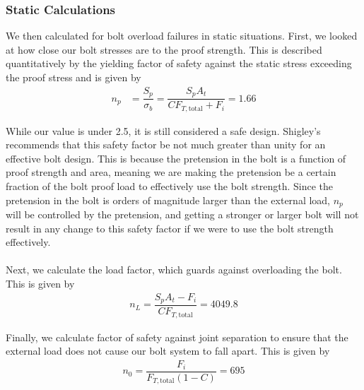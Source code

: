 \documentclass[letterpaper,12pt]{article}
\begin{document}
\subsubsection{Static Calculations}

We then calculated for bolt overload failures in static situations. First, we looked at how close our bolt stresses are to the proof strength. This is described quantitatively by the yielding factor of safety against the static stress exceeding the proof stress and is given by 
\begin{align*}
    n _ { p } &= \dfrac { S _ { p } } { \sigma _ { b } } = \dfrac { S _ { p } A _ { t } } { C F_{T,\text{total}} + F _ { i } } = 1.66
\end{align*}

\noindent While our value is under 2.5, it is still considered a safe design. Shigley's recommends that this safety factor be not much greater than unity for an effective bolt design. This is because the pretension in the bolt is a function of proof strength and area, meaning we are making the pretension be a certain fraction of the bolt proof load to effectively use the bolt strength. Since the pretension in the bolt is orders of magnitude larger than the external load, $n_p$ will be controlled by the pretension, and getting a stronger or larger bolt will not result in any change to this safety factor if we were to use the bolt strength effectively.
\\\\
\noindent Next, we calculate the load factor, which guards against overloading the bolt. This is given by
\begin{align*}
    n _ { L } = \dfrac { S _ { p } A _ { t } - F _ { i } } { C F_{T,\text{total}} } = 4049.8
\end{align*}

\noindent Finally, we calculate factor of safety against joint separation to ensure that the external load does not cause our bolt system to fall apart. This is given by
\begin{align*}
    n _ { 0 } = \dfrac { F _ { i } } { F_{T,\text{total}} ( 1 - C ) } = 695
\end{align*}
\end{document}

